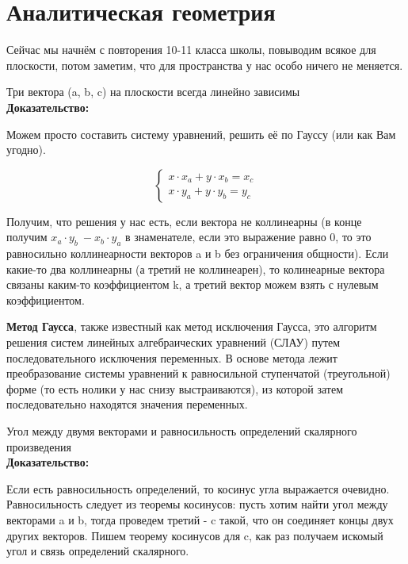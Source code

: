 \documentclass[12pt]{article}
\begin{document}
\section{Аналитическая геометрия}

Сейчас мы начнём с повторения 10-11 класса школы, повыводим всякое для плоскости, потом заметим, что для пространства у нас особо ничего не меняется.\\

\begin{theorembox}
Три вектора (a, b, c) на плоскости всегда линейно зависимы\\

\textbf{Доказательство:}

Можем просто составить систему уравнений, решить её по Гауссу (или как Вам угодно).

\[
\begin{cases}
x \cdot x_a + y \cdot x_b = x_c \\
x \cdot y_a + y \cdot y_b = y_c
\end{cases}
\]

Получим, что решения у нас есть, если вектора не коллинеарны (в конце получим $x_a \cdot y_b \ - x_b \cdot y_a$ в знаменателе, если это выражение равно 0, то это равносильно коллинеарности векторов a и b без ограничения общности). Если какие-то два коллинеарны (а третий не коллинеарен), то колинеарные вектора связаны каким-то коэффициентом k, а третий вектор можем взять с нулевым коэффициентом.
\end{theorembox}

\begin{definitionbox}
    \textbf{Метод Гаусса}, также известный как метод исключения Гаусса, это алгоритм решения систем линейных алгебраических уравнений (СЛАУ) путем последовательного исключения переменных. В основе метода лежит преобразование системы уравнений к равносильной ступенчатой (треугольной) форме (то есть нолики у нас снизу выстраиваются), из которой затем последовательно находятся значения переменных. 
\end{definitionbox}

\begin{theorembox}
Угол между двумя векторами и равносильность определений скалярного произведения\\

\textbf{Доказательство:}

Если есть равносильность определений, то косинус угла выражается очевидно. Равносильность следует из теоремы косинусов: пусть хотим найти угол между векторами a и b, тогда проведем третий - c такой, что он соединяет концы двух других векторов. Пишем теорему косинусов для c, как раз получаем искомый угол и связь определений скалярного.
\end{theorembox}
\end{document}
